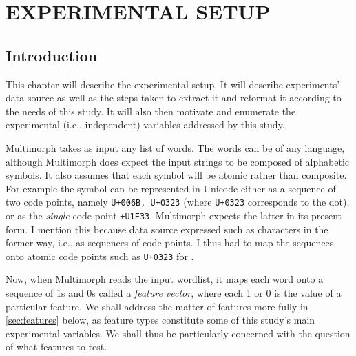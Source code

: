 \chapter{EXPERIMENTAL SETUP}

\section{Introduction}
This chapter will describe the experimental setup. It will describe experiments' 
data source as well as the steps taken to extract it and reformat it according 
to the needs of this study. It will also then motivate and enumerate the experimental 
(i.e., independent) variables addressed by this study.

Multimorph takes as input any list of words. The words can be of any
language, although Multimorph does expect the input strings to be composed
of alphabetic symbols. It also assumes that each symbol will be atomic rather 
than composite. 
For example the symbol \textsf{} can be represented in Unicode either 
as a sequence of two code points, namely \texttt{U+006B, U+0323} 
(where \texttt{U+0323}
corresponds to the dot), or as the \emph{single} code point \texttt{+U1E33}. 
Multimorph 
expects the latter in its present form. I mention this because data source 
expressed 
such as characters in the former way, i.e., as sequences of code points. I thus had
to map the sequences onto atomic code points such as \texttt{U+0323} 
for \textsf{}.

Now, when Multimorph reads the input wordlist, 
it maps each word onto
a sequence of 1s and 0s called a \emph{feature vector}, 
where each 1 or 0 is the value of a
particular feature. 
We shall address the matter of features more fully 
in \ref{sec:features} below, as feature types
constitute some of this study's main experimental 
variables. We shall thus be particularly 
concerned with the question of what features to test.


